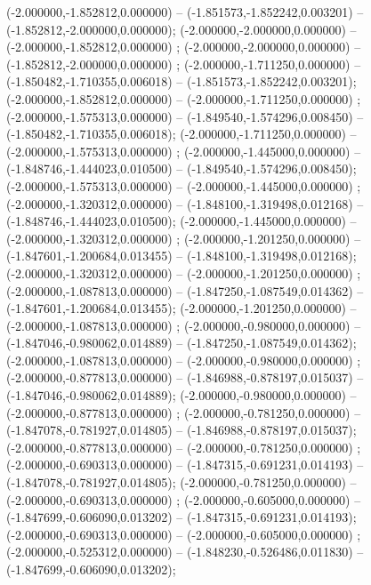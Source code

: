  (-2.000000,-1.852812,0.000000) -- (-1.851573,-1.852242,0.003201) -- (-1.852812,-2.000000,0.000000);
 (-2.000000,-2.000000,0.000000) -- (-2.000000,-1.852812,0.000000) ;
 (-2.000000,-2.000000,0.000000) -- (-1.852812,-2.000000,0.000000) ;
 (-2.000000,-1.711250,0.000000) -- (-1.850482,-1.710355,0.006018) -- (-1.851573,-1.852242,0.003201);
 (-2.000000,-1.852812,0.000000) -- (-2.000000,-1.711250,0.000000) ;
 (-2.000000,-1.575313,0.000000) -- (-1.849540,-1.574296,0.008450) -- (-1.850482,-1.710355,0.006018);
 (-2.000000,-1.711250,0.000000) -- (-2.000000,-1.575313,0.000000) ;
 (-2.000000,-1.445000,0.000000) -- (-1.848746,-1.444023,0.010500) -- (-1.849540,-1.574296,0.008450);
 (-2.000000,-1.575313,0.000000) -- (-2.000000,-1.445000,0.000000) ;
 (-2.000000,-1.320312,0.000000) -- (-1.848100,-1.319498,0.012168) -- (-1.848746,-1.444023,0.010500);
 (-2.000000,-1.445000,0.000000) -- (-2.000000,-1.320312,0.000000) ;
 (-2.000000,-1.201250,0.000000) -- (-1.847601,-1.200684,0.013455) -- (-1.848100,-1.319498,0.012168);
 (-2.000000,-1.320312,0.000000) -- (-2.000000,-1.201250,0.000000) ;
 (-2.000000,-1.087813,0.000000) -- (-1.847250,-1.087549,0.014362) -- (-1.847601,-1.200684,0.013455);
 (-2.000000,-1.201250,0.000000) -- (-2.000000,-1.087813,0.000000) ;
 (-2.000000,-0.980000,0.000000) -- (-1.847046,-0.980062,0.014889) -- (-1.847250,-1.087549,0.014362);
 (-2.000000,-1.087813,0.000000) -- (-2.000000,-0.980000,0.000000) ;
 (-2.000000,-0.877813,0.000000) -- (-1.846988,-0.878197,0.015037) -- (-1.847046,-0.980062,0.014889);
 (-2.000000,-0.980000,0.000000) -- (-2.000000,-0.877813,0.000000) ;
 (-2.000000,-0.781250,0.000000) -- (-1.847078,-0.781927,0.014805) -- (-1.846988,-0.878197,0.015037);
 (-2.000000,-0.877813,0.000000) -- (-2.000000,-0.781250,0.000000) ;
 (-2.000000,-0.690313,0.000000) -- (-1.847315,-0.691231,0.014193) -- (-1.847078,-0.781927,0.014805);
 (-2.000000,-0.781250,0.000000) -- (-2.000000,-0.690313,0.000000) ;
 (-2.000000,-0.605000,0.000000) -- (-1.847699,-0.606090,0.013202) -- (-1.847315,-0.691231,0.014193);
 (-2.000000,-0.690313,0.000000) -- (-2.000000,-0.605000,0.000000) ;
 (-2.000000,-0.525312,0.000000) -- (-1.848230,-0.526486,0.011830) -- (-1.847699,-0.606090,0.013202);
